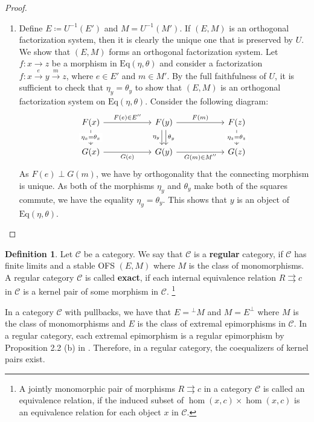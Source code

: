 \documentclass[11pt]{article}
\theoremstyle{plain}
\theoremstyle{definition}
\newtheorem{definition}[theorem]{Definition}
\numberwithin{equation}{section}
\newcommand{\C}{\mathcal{C}}
\newcommand{\Eq}{\mathrm{Eq}}
\begin{document}
\begin{proof}
\begin{enumerate}
   \item Define $E\coloneqq U^{-1}(E')$ and $M = U^{-1}(M')$. If $(E,M)$ is an orthogonal factorization system, then it is clearly the unique one that is preserved by $U$. We show that $(E,M)$ forms an orthogonal factorization system. Let $f\colon x\to z$ be a morphism in $\Eq(\eta,\theta)$ and consider a factorization $f\colon x\xrightarrow{e}y\xrightarrow{m}z$, where $e\in E'$ and $m\in M'$. By the full faithfulness of $U$, it is sufficient to check that $\eta_y = \theta_y$ to show that $(E,M)$ is an orthogonal factorization system on $\Eq(\eta,\theta)$. 
   Consider the following diagram:
   $$
\begin{tikzcd}[column sep = 2cm]
F(x) \arrow[d, "\eta_x = \theta_x" description] \arrow[r, "F(e)\in E''"] & F(y) \arrow[d, "\eta_y"', shift right] \arrow[d, "\theta_y", shift left] \arrow[r, "F(m)"] & F(z) \arrow[d, "\eta_z = \theta_z" description] \\
G(x) \arrow[r, "G(e)"']                                                 & G(y) \arrow[r, "G(m)\in M''"']                                                              & G(z)                                           
\end{tikzcd}
$$
   As $F(e)\perp G(m)$, we have by orthogonality that the connecting morphism is unique. As both of the morphisms $\eta_y$ and $\theta_y$ make both of the squares commute, we have the equality $\eta_y = \theta_y$. This shows that $y$ is an object of $\Eq(\eta,\theta)$. \qedhere
\end{enumerate}
\end{proof}

\begin{definition}
   Let $\C$ be a category. We say that $\C$ is a \textbf{regular} category, if $\C$ has finite limits and a stable OFS $(E,M)$ where $M$ is the class of monomorphisms. A regular category $\C$ is called \textbf{exact}, if each internal equivalence relation $R\rightrightarrows c$ in $\C$ is a kernel pair of some morphism in $\C$. \footnote{A jointly monomorphic pair of morphisms $R\rightrightarrows c$ in a category $\C$ is called an equivalence relation, if the induced subset of $\hom(x,c)\times \hom(x,c)$ is an equivalence relation for each object $x$ in $\C$.}
\end{definition}
In a category $\C$ with pullbacks, we have that $E =\! ^\perp\! M$ and $M = E^\perp$ where $M$ is the class of monomorphisms and $E$ is the class of extremal epimorphisms in $\C$. In a regular category, each extremal epimorphism is a regular epimorphism by Proposition 2.2 (b) in \cite{Kelly1991}. Therefore, in a regular category, the coequalizers of kernel pairs exist.
\end{document}
